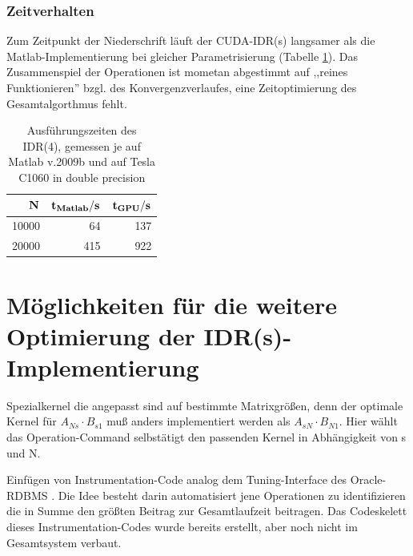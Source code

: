 \documentclass[journal]{IEEEtran}
\begin{document}
\subsubsection{Zeitverhalten}

Zum Zeitpunkt der Niederschrift läuft der CUDA-IDR(s) langsamer als
die Matlab-Implementierung bei gleicher Parametrisierung (Tabelle \ref{idrstimiing}).
Das Zusammenspiel der Operationen ist mometan abgestimmt auf ,,reines Funktionieren''
bzgl. des Konvergenzverlaufes, eine Zeitoptimierung des Gesamtalgorthmus fehlt.


\begin{table}[h]
\renewcommand{\arraystretch}{1.3}
\caption{Ausführungszeiten des IDR(4), gemessen je auf Matlab v.2009b und auf Tesla C1060 in double precision}
\label{idrstimiing}
\centering
\begin{tabular}{|r||r|r|}
\hline
\bfseries $ \bf N$ & \bfseries{ $ \bf t_{Matlab} / s $ } &  $ \bf t_{GPU} / s$  \\

\hline\hline
10000 & 64  &  137 \\

\hline

20000 & 415 & 922  \\



\hline
\end{tabular}
\end{table}

\section{Möglichkeiten für die weitere Optimierung der IDR(s)-Implementierung}

\begin{itemize}
 \begin{item}
Spezialkernel die angepasst
sind auf bestimmte Matrixgrößen, denn der optimale Kernel für
 $A_{Ns} \cdot B_{s1}$ muß anders implementiert werden als  $A_{sN} \cdot B_{N1}$.
Hier wählt das Operation-Command selbstätigt den passenden Kernel in Abhängigkeit
von s und N.
 \end{item}

\begin{item}

Einfügen von Instrumentation-Code analog dem Tuning-Interface des Oracle-RDBMS \cite{oracle}. Die Idee besteht darin
automatisiert jene Operationen zu identifizieren die in Summe den größten
Beitrag zur Gesamtlaufzeit beitragen.
Das Codeskelett dieses Instrumentation-Codes wurde bereits erstellt,
aber noch nicht im Gesamtsystem verbaut.
\end{item}


\end{itemize}
\end{document}
